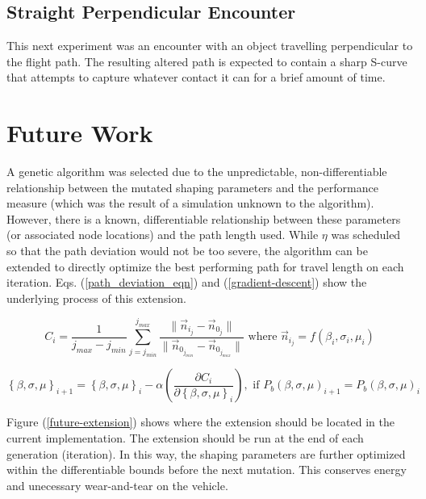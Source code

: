 \documentclass[conf]{new-aiaa}
\begin{document}
\subsection{Straight Perpendicular Encounter}
This next experiment was an encounter with an object travelling perpendicular to the flight path. The resulting altered path is expected to contain a sharp S-curve that attempts to capture whatever contact it can for a brief amount of time.



\section{Future Work}
A genetic algorithm was selected due to the unpredictable, non-differentiable relationship between the mutated shaping parameters and the performance measure (which was the result of a simulation unknown to the algorithm). However, there is a known, differentiable relationship between these parameters (or associated node locations) and the path length used. While $\eta$ was scheduled so that the path deviation would not be too severe, the algorithm can be extended to directly optimize the best performing path for travel length on each iteration. Eqs. (\ref{path_deviation_eqn}) and (\ref{gradient-descent}) show the underlying process of this extension.

\begin{equation}
\label{path_deviation_eqn}
C_i = \frac{1}{j_{max} - j_{min}}\sum\limits_{j=j_{min}}^{j_{max}}\frac{\|\vec{n}_{i_j} - \vec{n}_{0_j}\|}{\|\vec{n}_{0_{j_{min}}} - \vec{n}_{0_{j_{max}}}\|} \text{ where } \vec{n}_{i_j} = f\left(\beta_i, \sigma_i, \mu_i\right)
\end{equation}

\begin{equation}
\label{gradient-descent}
\left\{\beta, \sigma, \mu\right\}_{i + 1} = \left\{\beta, \sigma, \mu\right\}_i - \alpha\left(\frac{\partial{C_i}}{\partial{\left\{\beta, \sigma, \mu\right\}_i}}\right), \text{ if } P_b\left(\beta, \sigma, \mu\right)_{i + 1} = P_b\left(\beta, \sigma, \mu\right)_{i}
\end{equation}

Figure (\ref{future-extension}) shows where the extension should be located in the current implementation. The extension should be run at the end of each generation (iteration). In this way, the shaping parameters are further optimized within the differentiable bounds before the next mutation. This conserves energy and unecessary wear-and-tear on the vehicle.
\end{document}
